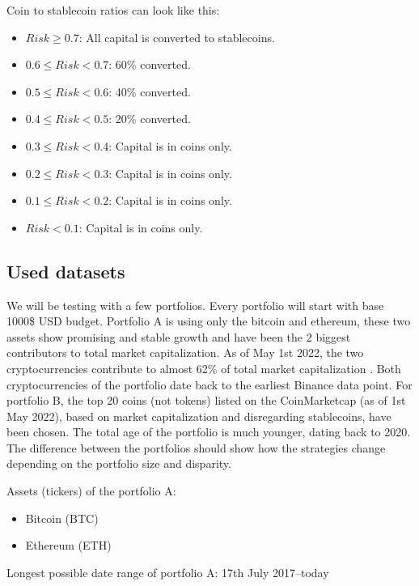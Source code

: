 Coin to stablecoin ratios can look like this:
\begin{itemize}
    \item $Risk \ge  0.7$: All capital is converted to stablecoins.
    \item $0.6 \le Risk < 0.7$: 60\% converted.
    \item $0.5 \le Risk < 0.6$: 40\% converted.
    \item $0.4 \le Risk < 0.5$: 20\% converted.
    \item $0.3 \le Risk < 0.4$: Capital is in coins only.
    \item $0.2 \le Risk < 0.3$: Capital is in coins only.
    \item $0.1 \le Risk < 0.2$: Capital is in coins only.
    \item $Risk < 0.1$: Capital is in coins only.
\end{itemize}


\subsection*{Used datasets}
We will be testing with a few portfolios. Every portfolio will start with base 1000\$ USD budget. Portfolio A is using only the bitcoin and ethereum, these two assets show promising and stable growth and have been the 2 biggest contributors to total market capitalization. As of May 1st 2022, the two cryptocurrencies contribute to almost 62\% of total market capitalization \cite{coinmarketcap:globalmetrics}. Both cryptocurrencies of the portfolio date back to the earliest Binance data point. For portfolio B, the top 20 coins (not tokens) listed on the CoinMarketcap \cite{coinmarketcap} (as of 1st May 2022), based on market capitalization and disregarding stablecoins, have been chosen. The total age of the portfolio is much younger, dating back to 2020. The difference between the portfolios should show how the strategies change depending on the portfolio size and disparity.

Assets (tickers) of the portfolio A:
\begin{itemize}
    \item Bitcoin (BTC)
    \item Ethereum (ETH)
\end{itemize}
Longest possible date range of portfolio A: 17th July 2017--today

